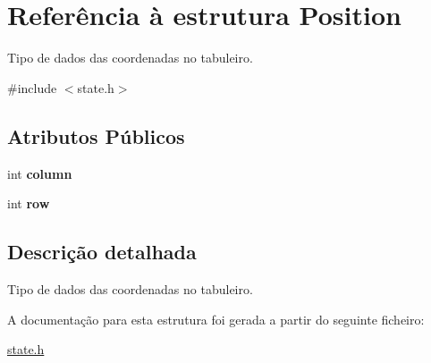 \hypertarget{structPosition}{}\section{Referência à estrutura Position}
\label{structPosition}


Tipo de dados das coordenadas no tabuleiro.  




{\ttfamily \#include $<$state.\+h$>$}

\subsection*{Atributos Públicos}
\begin{DoxyCompactItemize}
\item 
\mbox{\label{structPosition_a7bf46f67257b7fd5d6ced23095d15846}} 
int {\bfseries column}
\item 
\mbox{\label{structPosition_a224d714110152e1fca26b2437253f56a}} 
int {\bfseries row}
\end{DoxyCompactItemize}


\subsection{Descrição detalhada}
Tipo de dados das coordenadas no tabuleiro. 

A documentação para esta estrutura foi gerada a partir do seguinte ficheiro\+:\begin{DoxyCompactItemize}
\item 
\hyperlink{state_8h}{state.\+h}\end{DoxyCompactItemize}
